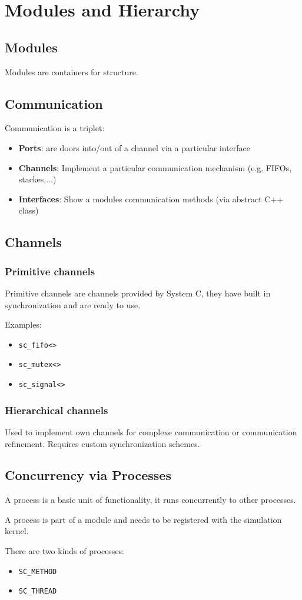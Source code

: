 \section{Modules and Hierarchy}
\subsection{Modules}
Modules are containers for structure.

\subsection{Communication}
Communication is a triplet:
\begin{itemize}
    \item \textbf{Ports}: are doors into/out of a channel via a particular interface
    \item \textbf{Channels}: Implement a particular communication mechanism (e.g. FIFOs, stackes,...) 
    \item \textbf{Interfaces}: Show a modules communication methods (via abstract C++ class)
\end{itemize}

\subsection{Channels}
\subsubsection{Primitive channels}
Primitive channels are channels provided by System C, they have built in synchronization and are ready to use.

Examples:
\begin{itemize}
    \item \lstinline{sc_fifo<>}
    \item \lstinline{sc_mutex<>}
    \item \lstinline{sc_signal<>}
\end{itemize}

\subsubsection{Hierarchical channels}
Used to implement own channels for complexe communication or communication refinement.
Requires custom synchronization schemes.

\subsection{Concurrency via Processes}
A process is a basic unit of functionality, it runs concurrently to other processes.

A process is part of a module and needs to be registered with the simulation kernel.

There are two kinds of processes:
\begin{itemize}
    \item \lstinline{SC_METHOD}
    \item \lstinline{SC_THREAD}
\end{itemize}
